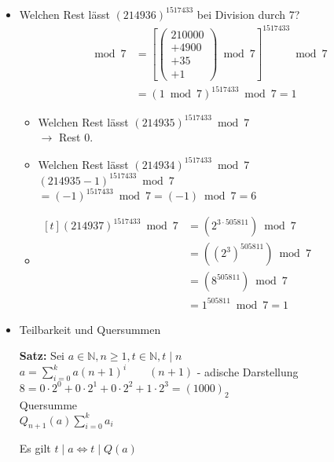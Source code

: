 \documentclass[a4paper, 12pt, twoside] {article}
\begin{document}
\begin{itemize}
 \item Welchen Rest lässt $(214936)^{1517433}$ bei Division durch 7?
 \begin{align*}
  [(214936)^{1517433}] \bmod 7 &=  \left[ \left(
  \begin{array}{r}
  210000\\
  + 4900 \\
  + 35 \\
  + 1 
  \end{array}\right) \bmod 7 \right]^{1517433} \bmod 7 \\
 							 &= (1 \bmod 7)^{1517433} \bmod 7 = 1
 \end{align*}

 \begin{itemize}
 \item Welchen Rest lässt $(214935)^{1517433} \bmod 7$ \\
 $\rightarrow$ Rest 0.

 \item Welchen Rest lässt $(214934)^{1517433} \bmod 7$ \\
 $(214935-1)^{1517433} \bmod 7$ \\
 $=(-1)^{1517433} \bmod 7 = (-1) \bmod 7 = 6$

 \item $\begin{aligned}[t]
(214937)^{1517433} \bmod 7 &=(2^{3 \cdot 505811}) \bmod 7 \\
						   &= ((2^3)^{505811}) \bmod 7 \\
						   &=(8^{505811}) \bmod 7  \\
						   &= 1^{505811} \bmod 7 = 1
\end{aligned}$

\end{itemize}

 \item Teilbarkeit und Quersummen

 \textbf{Satz:} Sei $ a \in \mathbb{N}, n \geq 1, t \in \mathbb{N}, t \mid n$ \\
$a = \displaystyle\sum^{k}_{i = 0} a (n+1)^i \qquad (n+1)$ - adische Darstellung \\

$8 = 0 \cdot 2^0 + 0 \cdot 2^1 + 0 \cdot 2^2  + 1 \cdot 2^3 = (1000)_2$ \\

Quersumme \\
$Q_{n+1} (a) \displaystyle\sum^{k}_{i=0} a_i$

Es gilt $t \mid a \Leftrightarrow t \mid Q(a)$


\end{itemize}
\end{document}
